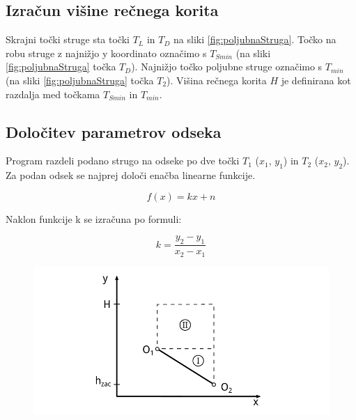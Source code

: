 \subsection{Izračun višine rečnega korita}
Skrajni točki struge sta točki $T_L$ in $T_D$ na sliki \ref{fig:poljubnaStruga}. Točko na robu struge z najnižjo y koordinato označimo s $T_{Smin}$ (na sliki \ref{fig:poljubnaStruga} točka $T_D$). Najnižjo točko poljubne struge označimo s $T_{min}$ (na sliki \ref{fig:poljubnaStruga} točka $T_2$). Višina rečnega korita $H$ je definirana kot razdalja med točkama $T_{Smin}$ in $T_{min}$.




\subsection{Določitev parametrov odseka}

Program razdeli podano strugo na odseke po dve točki $T_1$ ($x_1$, $y_1$) in $T_2$ ($x_2$, $y_2$). Za podan odsek se najprej določi enačba linearne funkcije. 

\begin{equation}
f(x) = kx + n
\end{equation} \label{eq:enacba_linearnafunkcija}

Naklon funkcije k se izračuna po formuli: 

\begin{equation}
k = \dfrac{y_2 - y_1}{x_2 - x_1}
\end{equation}



\begin{figure}[ht]
	\begin{centering}
		\includegraphics{slike/customChannel/odsek.pdf}
			 \label{fig:odsekStruge}
			
	\end{centering}
\end{figure}




